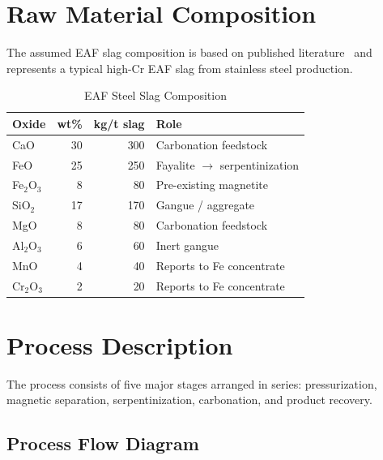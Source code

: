 \documentclass[11pt,a4paper]{article}
\begin{document}
\section{Raw Material Composition}

The assumed EAF slag composition is based on published literature~\cite{piatak2015} and
represents a typical high-Cr EAF slag from stainless steel production.

\begin{table}[H]
\centering
\caption{EAF Steel Slag Composition}
\label{tab:composition}
\begin{tabular}{@{}lrrl@{}}
\toprule
\textbf{Oxide} & \textbf{wt\%} & \textbf{kg/t slag} & \textbf{Role} \\
\midrule
CaO     & 30 & 300 & Carbonation feedstock \\
FeO     & 25 & 250 & Fayalite $\rightarrow$ serpentinization \\
Fe$_2$O$_3$  & 8  & 80  & Pre-existing magnetite \\
SiO$_2$ & 17 & 170 & Gangue / aggregate \\
MgO     & 8  & 80  & Carbonation feedstock \\
Al$_2$O$_3$  & 6  & 60  & Inert gangue \\
MnO     & 4  & 40  & Reports to Fe concentrate \\
Cr$_2$O$_3$  & 2  & 20  & Reports to Fe concentrate \\
\bottomrule
\end{tabular}
\end{table}

\section{Process Description}

The process consists of five major stages arranged in series:
pressurization, magnetic separation, serpentinization, carbonation,
and product recovery.

\subsection{Process Flow Diagram}
\end{document}
